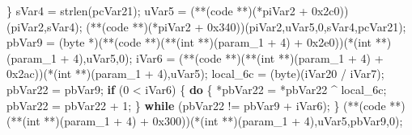 \documentclass[
]{article}
\newenvironment{Shaded}{}{}
\newcommand{\BaseNTok}[1]{\textcolor[rgb]{0.25,0.63,0.44}{#1}}
\newcommand{\ControlFlowTok}[1]{\textcolor[rgb]{0.00,0.44,0.13}{\textbf{#1}}}
\newcommand{\DataTypeTok}[1]{\textcolor[rgb]{0.56,0.13,0.00}{#1}}
\newcommand{\DecValTok}[1]{\textcolor[rgb]{0.25,0.63,0.44}{#1}}
\newcommand{\NormalTok}[1]{#1}
\newcommand{\OperatorTok}[1]{\textcolor[rgb]{0.40,0.40,0.40}{#1}}
\begin{document}
\begin{Shaded}
\begin{Highlighting}[]
  \OperatorTok{\}}
\NormalTok{  sVar4 }\OperatorTok{=}\NormalTok{ strlen}\OperatorTok{(}\NormalTok{pcVar21}\OperatorTok{);}
\NormalTok{  uVar5 }\OperatorTok{=} \OperatorTok{(**(}\NormalTok{code }\OperatorTok{**)(*}\NormalTok{piVar2 }\OperatorTok{+} \BaseNTok{0x2c0}\OperatorTok{))(}\NormalTok{piVar2}\OperatorTok{,}\NormalTok{sVar4}\OperatorTok{);}
  \OperatorTok{(**(}\NormalTok{code }\OperatorTok{**)(*}\NormalTok{piVar2 }\OperatorTok{+} \BaseNTok{0x340}\OperatorTok{))(}\NormalTok{piVar2}\OperatorTok{,}\NormalTok{uVar5}\OperatorTok{,}\DecValTok{0}\OperatorTok{,}\NormalTok{sVar4}\OperatorTok{,}\NormalTok{pcVar21}\OperatorTok{);}
\NormalTok{  pbVar9 }\OperatorTok{=} \OperatorTok{(}\NormalTok{byte }\OperatorTok{*)(**(}\NormalTok{code }\OperatorTok{**)(**(}\DataTypeTok{int} \OperatorTok{**)(}\NormalTok{param\_1 }\OperatorTok{+} \DecValTok{4}\OperatorTok{)} \OperatorTok{+} \BaseNTok{0x2e0}\OperatorTok{))(*(}\DataTypeTok{int} \OperatorTok{**)(}\NormalTok{param\_1 }\OperatorTok{+} \DecValTok{4}\OperatorTok{),}\NormalTok{uVar5}\OperatorTok{,}\DecValTok{0}\OperatorTok{);}
\NormalTok{  iVar6 }\OperatorTok{=} \OperatorTok{(**(}\NormalTok{code }\OperatorTok{**)(**(}\DataTypeTok{int} \OperatorTok{**)(}\NormalTok{param\_1 }\OperatorTok{+} \DecValTok{4}\OperatorTok{)} \OperatorTok{+} \BaseNTok{0x2ac}\OperatorTok{))(*(}\DataTypeTok{int} \OperatorTok{**)(}\NormalTok{param\_1 }\OperatorTok{+} \DecValTok{4}\OperatorTok{),}\NormalTok{uVar5}\OperatorTok{);}
\NormalTok{  local\_6c }\OperatorTok{=} \OperatorTok{(}\NormalTok{byte}\OperatorTok{)(}\NormalTok{iVar20 }\OperatorTok{/}\NormalTok{ iVar7}\OperatorTok{);}
\NormalTok{  pbVar22 }\OperatorTok{=}\NormalTok{ pbVar9}\OperatorTok{;}
  \ControlFlowTok{if} \OperatorTok{(}\DecValTok{0} \OperatorTok{\textless{}}\NormalTok{ iVar6}\OperatorTok{)} \OperatorTok{\{}
    \ControlFlowTok{do} \OperatorTok{\{}
      \OperatorTok{*}\NormalTok{pbVar22 }\OperatorTok{=} \OperatorTok{*}\NormalTok{pbVar22 }\OperatorTok{\^{}}\NormalTok{ local\_6c}\OperatorTok{;}
\NormalTok{      pbVar22 }\OperatorTok{=}\NormalTok{ pbVar22 }\OperatorTok{+} \DecValTok{1}\OperatorTok{;}
    \OperatorTok{\}} \ControlFlowTok{while} \OperatorTok{(}\NormalTok{pbVar22 }\OperatorTok{!=}\NormalTok{ pbVar9 }\OperatorTok{+}\NormalTok{ iVar6}\OperatorTok{);}
  \OperatorTok{\}}
  \OperatorTok{(**(}\NormalTok{code }\OperatorTok{**)(**(}\DataTypeTok{int} \OperatorTok{**)(}\NormalTok{param\_1 }\OperatorTok{+} \DecValTok{4}\OperatorTok{)} \OperatorTok{+} \BaseNTok{0x300}\OperatorTok{))(*(}\DataTypeTok{int} \OperatorTok{**)(}\NormalTok{param\_1 }\OperatorTok{+} \DecValTok{4}\OperatorTok{),}\NormalTok{uVar5}\OperatorTok{,}\NormalTok{pbVar9}\OperatorTok{,}\DecValTok{0}\OperatorTok{);}

\end{Highlighting}
\end{Shaded}
\end{document}
